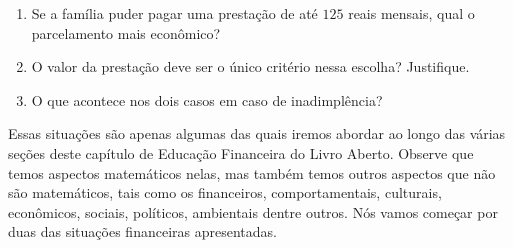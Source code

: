 \begin{enumerate}
\item Se a família puder pagar uma prestação de até $125$ reais mensais, qual o parcelamento mais econômico?
\item O valor da prestação deve ser o único critério nessa escolha? Justifique.
\item  O que acontece nos dois casos em caso de inadimplência?
\end{enumerate}

Essas situações são apenas algumas das quais iremos abordar ao longo das várias seções deste capítulo de Educação Financeira do Livro Aberto. Observe que temos aspectos matemáticos nelas, mas também temos outros aspectos que não são matemáticos, tais como os financeiros, comportamentais, culturais, econômicos, sociais, políticos, ambientais dentre outros. Nós vamos começar por duas das situações financeiras apresentadas. 

